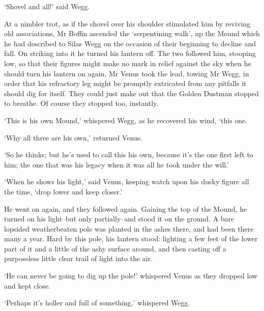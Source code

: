 ‘Shovel and all!’ said Wegg.

At a nimbler trot, as if the shovel over his shoulder stimulated him by
reviving old associations, Mr Boffin ascended the ‘serpentining walk’,
up the Mound which he had described to Silas Wegg on the occasion of
their beginning to decline and fall. On striking into it he turned his
lantern off. The two followed him, stooping low, so that their figures
might make no mark in relief against the sky when he should turn his
lantern on again. Mr Venus took the lead, towing Mr Wegg, in order that
his refractory leg might be promptly extricated from any pitfalls it
should dig for itself. They could just make out that the Golden Dustman
stopped to breathe. Of course they stopped too, instantly.

‘This is his own Mound,’ whispered Wegg, as he recovered his wind, ‘this
one.

‘Why all three are his own,’ returned Venus.

‘So he thinks; but he’s used to call this his own, because it’s the one
first left to him; the one that was his legacy when it was all he took
under the will.’

‘When he shows his light,’ said Venus, keeping watch upon his dusky
figure all the time, ‘drop lower and keep closer.’

He went on again, and they followed again. Gaining the top of the Mound,
he turned on his light--but only partially--and stood it on the ground.
A bare lopsided weatherbeaten pole was planted in the ashes there,
and had been there many a year. Hard by this pole, his lantern stood:
lighting a few feet of the lower part of it and a little of the ashy
surface around, and then casting off a purposeless little clear trail of
light into the air.

‘He can never be going to dig up the pole!’ whispered Venus as they
dropped low and kept close.

‘Perhaps it’s holler and full of something,’ whispered Wegg.

